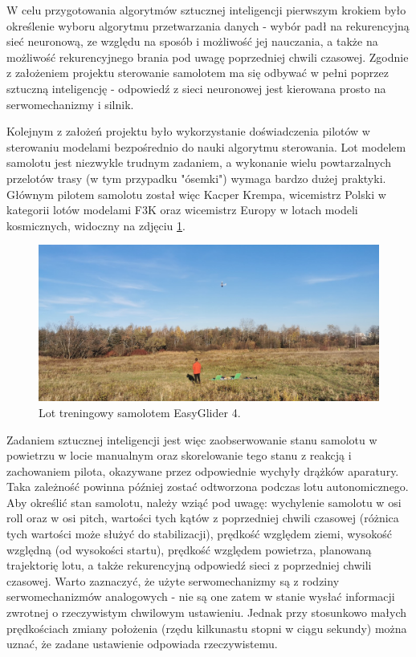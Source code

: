 \documentclass[12pt, a4paper]{article}
\begin{document}
W celu przygotowania algorytmów sztucznej inteligencji pierwszym krokiem było określenie wyboru algorytmu przetwarzania danych - wybór padł na rekurencyjną sieć neuronową, ze względu na sposób i możliwość jej nauczania, a także na możliwość rekurencyjnego brania pod uwagę poprzedniej chwili czasowej. Zgodnie z założeniem projektu sterowanie samolotem ma się odbywać w pełni poprzez sztuczną inteligencję - odpowiedź z sieci neuronowej jest kierowana prosto na serwomechanizmy i silnik. 

Kolejnym z założeń projektu było wykorzystanie doświadczenia pilotów w sterowaniu modelami  bezpośrednio do nauki algorytmu sterowania. Lot modelem samolotu jest niezwykle trudnym zadaniem, a wykonanie wielu powtarzalnych przelotów trasy (w tym przypadku "ósemki") wymaga bardzo dużej praktyki. Głównym pilotem samolotu został więc Kacper Krempa, wicemistrz Polski w kategorii lotów modelami F3K oraz wicemistrz Europy w lotach modeli kosmicznych, widoczny na zdjęciu \ref{fig:kacper}.

 \begin{figure}[ht]
    \centering
    \includegraphics[width=1\textwidth]{kacperlata}
    \caption{Lot treningowy samolotem EasyGlider 4.}
    \label{fig:kacper}
\end{figure}


Zadaniem sztucznej inteligencji jest więc zaobserwowanie stanu samolotu w powietrzu w locie manualnym oraz skorelowanie tego stanu z reakcją i zachowaniem pilota, okazywane przez odpowiednie wychyły drążków aparatury. Taka zależność powinna później zostać odtworzona podczas lotu autonomicznego. Aby określić stan samolotu, należy wziąć pod uwagę: wychylenie samolotu w osi roll oraz w osi pitch, wartości tych kątów z poprzedniej chwili czasowej (różnica tych wartości może służyć do stabilizacji), prędkość względem ziemi, wysokość względną (od wysokości startu), prędkość względem powietrza, planowaną trajektorię lotu, a także rekurencyjną odpowiedź sieci z poprzedniej chwili czasowej. Warto zaznaczyć, że użyte serwomechanizmy są z rodziny serwomechanizmów analogowych - nie są one zatem w stanie wysłać informacji zwrotnej o rzeczywistym chwilowym ustawieniu. Jednak przy stosunkowo małych prędkościach zmiany położenia (rzędu kilkunastu stopni w ciągu sekundy) można uznać, że zadane ustawienie odpowiada rzeczywistemu.
\end{document}
